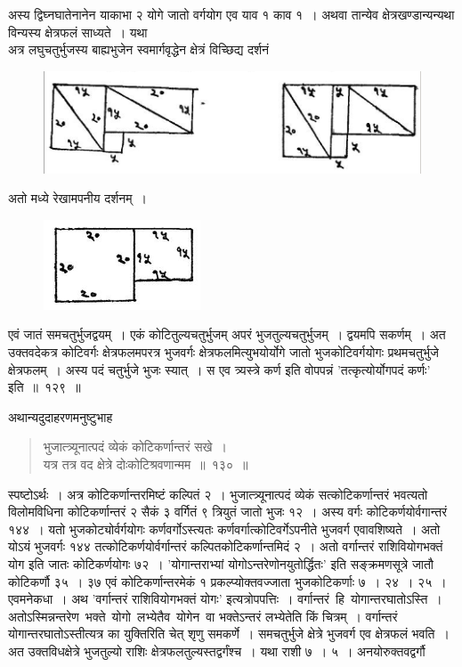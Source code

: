 \documentclass[11pt, openany]{book}
\begin{document}
 अस्य द्विघ्नघातेनानेन याकाभा २ योगे जातो वर्गयोग एव याव १ काव १~। 
अथवा तान्येव क्षेत्रखण्डान्यन्यथा विन्यस्य क्षेत्रफलं साध्यते~। यथा\textendash\\

\vspace{-4mm}
 अत्र लघुचतुर्भुजस्य बाह्यभुजेन स्वमार्गवृद्धेन क्षेत्रं विच्छिद्य दर्शनं 
\begin{figure}[h!]
    \centering
    \includegraphics[scale=0.75]{graphics/Capture14.png}
\end{figure}

अतो मध्ये रेखामपनीय दर्शनम्~। 
\begin{figure}[h!]
    \centering
    \includegraphics[scale=0.75]{graphics/Capture15.png}
\end{figure}

एवं जातं समचतुर्भुजद्वयम्~। एकं कोटितुल्यचतुर्भुजम् अपरं
भुजतुल्यचतुर्भुजम्~। द्वयमपि सकर्णम्~। अत उक्तवदेकत्र कोटिवर्गः क्षेत्रफलमपरत्र भुजवर्गः क्षेत्रफलमित्युभयोर्योगे जातो भुजकोटिवर्गयोगः प्रथमचतुर्भुजे क्षेत्रफलम्~। अस्य
पदं चतुर्भुजे भुजः स्यात्~। स एव त्र्यस्त्रे कर्ण इति वोपपन्नं {\qt 'तत्कृत्योर्योगपदं कर्णः'} इति~॥~१२९~॥
 \newpage 

 अथान्यदुदाहरणमनुष्टुभाह\textendash
\begin{quote}
    \eg 
     भुजात्त्र्यूनात्पदं व्येकं कोटिकर्णान्तरं सखे~। \\
 यत्र तत्र वद क्षेत्रे दोःकोटिश्रवणान्मम~॥~१३०~॥~

\end{quote}

 स्पष्टोऽर्थः~। अत्र कोटिकर्णान्तरमिष्टं कल्पितं २~। भुजात्त्र्यूनात्पदं
व्येकं सत्कोटिकर्णान्तरं भवत्यतो विलोमविधिना कोटिकर्णान्तरं २ सैकं ३ वर्गितं ९
त्रियुतं जातो 
भुजः १२~। अस्य वर्गः कोटिकर्णयोर्वगान्तरं १४४~। यतो भुजकोट्योर्वर्गयोगः
कर्णवर्गोऽस्त्यतः कर्णवर्गात्कोटिवर्गेऽपनीते भुजवर्ग एवावशिष्यते~। अतो
योऽयं भुजवर्गः 
१४४ तत्कोटिकर्णयोर्वर्गान्तरं कल्पितकोटिकर्णान्तमिदं २~। अतो वर्गान्तरं
राशिवियोगभक्तं योग इति जातः कोटिकर्णयोगः ७२~। {\qt 'योगान्तराभ्यां योगोऽन्तरेणोनयुतोर्द्धितः'} इति सङ्क्रमणसूत्रे जातौ कोटिकर्णौ ३५~। ३७ एवं
कोटिकर्णान्तरमेकं १ प्रकल्प्योक्तवज्जाता भुजकोटिकर्णाः ७~। २४~। २५~। एवमनेकधा~। अथ {\qt 'वर्गान्तरं राशिवियोगभक्तं योगः'} इत्यत्रोपपत्तिः~। वर्गान्तरं \,हि \,योगान्तरघातोऽस्ति~। अतोऽस्मिन्नन्तरेण \,भक्ते \,योगो \,लभ्येतैव \,योगेन \,वा भक्तेऽन्तरं लभ्येतेति
किं चित्रम्~। 
वर्गान्तरं योगान्तरघातोऽस्तीत्यत्र का युक्तिरिति चेत् शृणु समकर्णे~।
समचतुर्भुजे क्षेत्रे 
भुजवर्ग एव क्षेत्रफलं भवति~। अत उक्तविधक्षेत्रे भुजतुल्यो राशिः
क्षेत्रफलतुल्यस्तद्वर्गंश्च~। 
यथा राशी ७~। ५~। अनयोरुक्तवद्वर्गौ 
\end{document}
